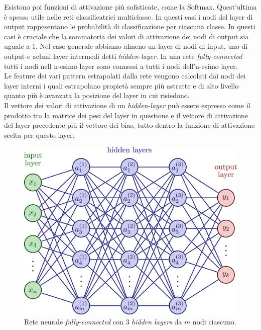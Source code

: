 \documentclass[12pt,a4paper,openright,twoside]{report}
\begin{document}
Esistono poi funzioni di attivazione più sofisticate, come la Softmax.
Quest'ultima è spesso utile nelle reti classificatrici multiclasse. In questi casi i nodi del layer di output rappesentano le probabilità di classificazione per ciascuna classe. In questi casi è cruciale che la sommatoria dei valori di attivazione dei nodi di output sia uguale a 1.
\newpage
Nel caso generale abbiamo almeno un layer di nodi di input, uno di output e acluni layer intermedi detti \emph{hidden-layer}.
In una rete \emph{fully-connected} tutti i nodi nell n-esimo layer sono connessi a tutti i nodi dell'n-esimo layer. \\
Le feature dei vari pattern estrapolati dalla rete vengono calcolati dai nodi dei layer interni i quali estrapolano propietà sempre più astratte e di alto livello quanto più è avanzata la posizione del layer in cui risiedono. \\
Il vettore dei valori di attivazione di un \emph{hidden-layer} può essere espresso come il prodotto tra la matrice dei pesi del layer in questione e il vettore di attivazione del layer precedente più il vettore dei bias, tutto dentro la funzione di attivazione scelta per questo layer.

\begin{figure}[h]
\centering
\includegraphics[width=\linewidth]{neural_networks-004.png}
\caption{Rete neurale \emph{fully-connected} con $3$ \emph{hidden layers} da $m$ nodi ciascuno.}
\end{figure}
\end{document}
